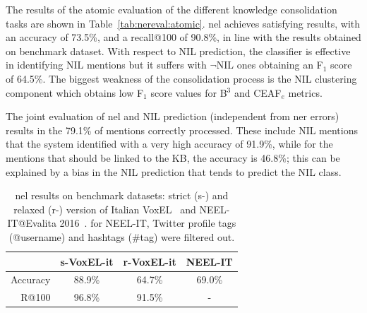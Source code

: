 The results of the atomic evaluation of the different knowledge consolidation tasks are shown in Table~\ref{tab:nereval:atomic}. \ac{nel} achieves satisfying results, with an accuracy of 73.5\%, and a recall@100 of 90.8\%, in line with the results obtained on benchmark dataset.
With respect to NIL prediction, the classifier is effective in identifying NIL mentions but it suffers with $\neg$NIL ones obtaining an F$_1$ score of 64.5\%.
The biggest weakness of the consolidation process is the NIL clustering component which obtains low F$_1$ score values for B$^3$ and CEAF$_e$ metrics.

The joint evaluation of \ac{nel} and NIL prediction (independent from \ac{ner} errors) results in the 79.1\% of mentions correctly processed. These include NIL mentions that the system identified with a very high accuracy of 91.9\%, while for the mentions that should be linked to the KB, the accuracy is 46.8\%; this can be explained by a bias in the NIL prediction that tends to predict the NIL class. 

\begin{table}[h]
    \centering
    \begin{tabular}{r|ccc}
        & s-VoxEL-it & r-VoxEL-it & NEEL-IT \\
        \hline
        Accuracy  & 88.9\% & 64.7\% & 69.0\% \\
        R@100 & 96.8\% & 91.5\% & - \\
    \end{tabular}
    \caption{\ac{nel} results on benchmark datasets: strict (s-) and relaxed (r-) version of Italian VoxEL~\cite{rosales2018voxel} and NEEL-IT@Evalita 2016~\cite{basile2016neelit}. for NEEL-IT, Twitter profile tags (@username) and hashtags (\#tag) were filtered out.}
    \label{tab:nelsota}
\end{table}

